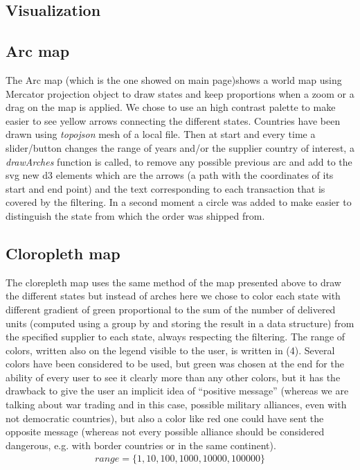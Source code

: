 \documentclass{article}
\begin{document}
\begin{multicols}{2}
\section{Visualization}
\subsection{Arc map}
The Arc map (which is the one showed on main page)shows a world map using Mercator projection object to draw states and keep proportions when a zoom or a drag on the map is applied. We chose to use an high contrast palette to make easier to see yellow arrows connecting the different states. Countries have been drawn using \textit{topojson} mesh of a local file. Then at start and every time a slider/button changes the range of years and/or the supplier country of interest, a \textit{drawArches} function is called, to remove any possible previous arc and add to the svg new d3 elements which are the arrows (a path with the coordinates of its start and end point) and the text corresponding to each transaction that is covered by the filtering. In a second moment a circle was added to make easier to distinguish the state from which the order was shipped from.

\subsection{Cloropleth map}
The clorepleth map uses the same method of the map presented above to draw the different states but instead of arches here we chose to color each state with different gradient of green proportional to the sum of the number of delivered units (computed using a group by and storing the result in a data structure) from the specified supplier to each state, always respecting the filtering. The range of colors, written also on the legend visible to the user, is written in (4). Several colors have been considered to be used, but green was chosen at the end for the ability of every user to see it clearly more than any other colors, but it has the drawback to give the user an implicit idea of “positive message” (whereas we are talking about war trading and in this case, possible military alliances, even with not democratic countries), but also a color like red one could have sent the opposite message (whereas not every possible alliance should be considered dangerous, e.g. with border countries or in the same continent).
\begin{align}
	range=\{1,10,100,1000,10000,100000\}
\end{align}



\end{multicols}
\end{document}

